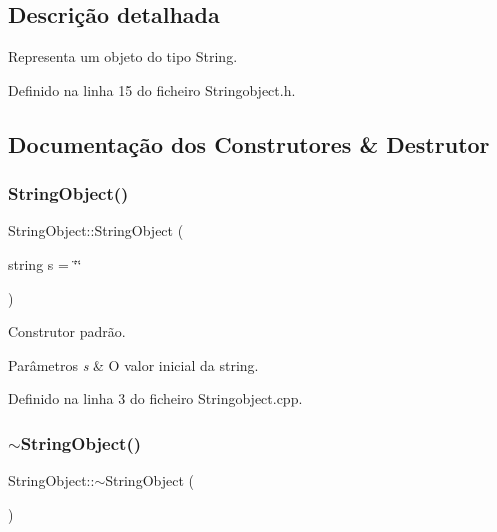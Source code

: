 \subsection{Descrição detalhada}
Representa um objeto do tipo String. 

Definido na linha 15 do ficheiro Stringobject.\+h.



\subsection{Documentação dos Construtores \& Destrutor}
\mbox{\label{classStringObject_af29d58fcfbd76c7708e5c8689321ab32}} 
\subsubsection{\texorpdfstring{String\+Object()}{StringObject()}}
{\footnotesize\ttfamily String\+Object\+::\+String\+Object (\begin{DoxyParamCaption}\item[{string}]{s = {\ttfamily \char`\"{}\char`\"{}} }\end{DoxyParamCaption})}



Construtor padrão. 


\begin{DoxyParams}{Parâmetros}
{\em s} & O valor inicial da string. \\
\hline
\end{DoxyParams}


Definido na linha 3 do ficheiro Stringobject.\+cpp.

\mbox{\label{classStringObject_a7db6683d04fe432e570458daf305500b}} 
\subsubsection{\texorpdfstring{$\sim$\+String\+Object()}{~StringObject()}}
{\footnotesize\ttfamily String\+Object\+::$\sim$\+String\+Object (\begin{DoxyParamCaption}{ }\end{DoxyParamCaption})}



